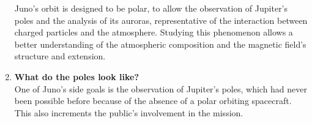 \begin{enumerate}
    Juno's orbit is designed to be polar, to allow the observation of Jupiter's poles and the analysis of its auroras, representative of the interaction between charged particles and the atmosphere. Studying this phenomenon allows a better understanding of the atmospheric composition and the magnetic field's structure and extension.
    \item \textbf{What do the poles look like?}\\ %
    \label{goal 5}
    One of Juno's side goals is the observation of Jupiter's poles, which had never been possible before because of the absence of a polar orbiting spacecraft. This also increments the public's involvement in the mission.

\end{enumerate}